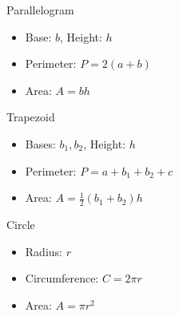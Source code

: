 \documentclass[twocolumn,a4]{article}
\begin{document}
\noindent Parallelogram \\
\begin{minipage}{0.4\linewidth}
    \begin{itemize}
        \item Base: $b$, Height: $h$
        \item Perimeter: $P = 2(a + b)$
        \item Area: $A = b h$
    \end{itemize}
\end{minipage}
\begin{minipage}{0.4\linewidth}
\end{minipage}

\noindent Trapezoid \\
\begin{minipage}{0.5\linewidth}
    \begin{itemize}
        \item Bases: $b_1, b_2$, Height: $h$
        \item Perimeter: $P = a + b_1 + b_2 + c$
        \item Area: $A = \frac{1}{2} (b_1 + b_2) h$
    \end{itemize}
\end{minipage}
\begin{minipage}{0.4\linewidth}
\end{minipage}

\noindent Circle \\
\begin{minipage}{0.5\linewidth}
	\begin{itemize}
	    \item Radius: $r$
	    \item Circumference: $C = 2\pi r$
	    \item Area: $A = \pi r^2$
	\end{itemize}
\end{minipage}
\begin{minipage}{0.4\linewidth}
\end{minipage}
\end{document}
